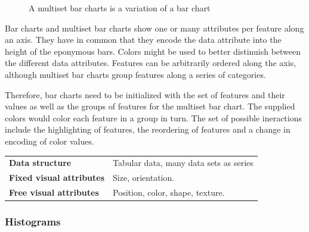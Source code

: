 \documentclass{article}
\newcommand{\conceptTable}[3]{%
    \begin{center}
    {\small
        \begin{tabulary}{\textwidth}{ll}
            \bf Data structure & #1 \\

            \bf Fixed visual attributes & #2 \\

            \bf Free visual attributes & #3  \\
        \end{tabulary}
    }
    \end{center}
}
\begin{document}
\begin{figure}
  \begin{center}
    \qquad
  \end{center}
  \caption{A multiset bar charts is a variation of a bar chart}
  \label{fig:concept:chart-types:bar-charts}
\end{figure}

Bar charts and multiset bar charts show one or many attributes per feature along an axis.
They have in common that they encode the data attribute into the height of the eponymous bars.
Colors might be used to better distinuish between the different data attributes.
Features can be arbitrarily ordered along the axis, although multiset bar charts group features along a series of categories.

Therefore, bar charts need to be initialized with the set of features and their values as well as the groups of features for the multiset bar chart.
The supplied colors would color each feature in a group in turn.
The set of possible ineractions include the highlighting of features, the reordering of features and a change in encoding of color values.

\conceptTable{Tabular data, many data sets as series}{Size, orientation.}{Position, color, shape, texture.}

\subsubsection{Histograms}
\end{document}
